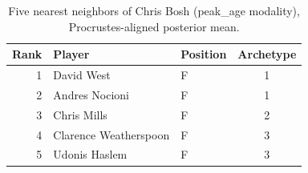 \begin{table}[htbp]
  \centering\small
  \begin{tabular}{rllc}
    \toprule
    Rank & Player & Position & Archetype \\
    \midrule
    1 & David West & F & 1 \\
    2 & Andres Nocioni & F & 1 \\
    3 & Chris Mills & F & 2 \\
    4 & Clarence Weatherspoon & F & 3 \\
    5 & Udonis Haslem & F & 3 \\
    \bottomrule
  \end{tabular}
  \caption{Five nearest neighbors of Chris Bosh (peak_age modality), Procrustes-aligned posterior mean.}
  \label{tab:Chris_Bosh_neighbors_peak_age}
\end{table}

